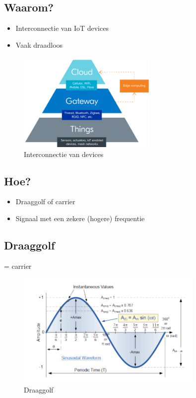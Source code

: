 \documentclass{article}
\begin{document}
\subsection{Waarom?}

\begin{itemize}
    \item Interconnectie van IoT devices
    \item Vaak draadloos
\end{itemize}

\begin{figure}[H]
    \centering
    \includegraphics[width=0.6\textwidth]{Screenshot_20200302_115646.png}
    \caption{Interconnectie van devices}
\end{figure}

\subsection{Hoe?}
\begin{itemize}
    \item Draaggolf of carrier
    \item Signaal met een zekere (hogere) frequentie
\end{itemize}

\subsection{Draaggolf}
= carrier

\begin{figure}[H]
    \centering
    \includegraphics[width=0.8\textwidth]{Screenshot_20200302_115827.png}
    \caption{Draaggolf}
\end{figure}
\end{document}

